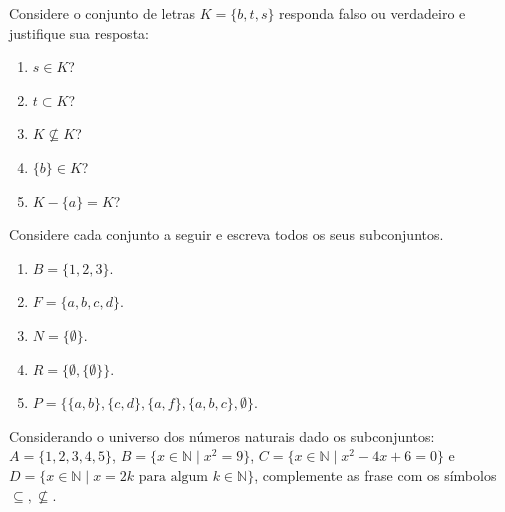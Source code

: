 \begin{exercise}\label{exerc:Conjuntos3}
	Considere o conjunto de letras $K = \{b, t, s\}$ responda falso ou verdadeiro e justifique sua resposta:
\end{exercise}

\begin{enumerate}
	\item $s \in K$?
	\item $t \subset K$?
	\item $K \not\subseteq K$?
	\item $\{b\} \in K$?
	\item $K - \{a\} = K$?
\end{enumerate}

\begin{exercise}\label{exerc:Conjuntos4}
	Considere cada conjunto a seguir e escreva todos os seus subconjuntos.
\end{exercise}

\begin{enumerate}
	\item $B = \{1, 2, 3\}$.
	\item $F = \{a, b, c, d\}$.
	\item $N = \{\emptyset\}$.
	\item $R = \{\emptyset, \{\emptyset\}\}$.
	\item $P = \{\{a, b\}, \{c, d\}, \{a, f\}, \{a, b, c\}, \emptyset\}$.
\end{enumerate}

\begin{exercise}\label{exerc:Conjuntos5}
	Considerando o universo dos números naturais dado os subconjuntos:  $A = \{1, 2, 3, 4, 5\}$, $B = \{x \in \mathbb{N} \mid x^2 = 9\}$, $C = \{x \in \mathbb{N} \mid x^2 - 4x + 6 = 0\}$ e $D = \{x \in \mathbb{N} \mid  x = 2k \mbox{ para algum } k \in \mathbb{N}\}$, complemente as frase com os símbolos $\subseteq, \not\subseteq$.
\end{exercise}

